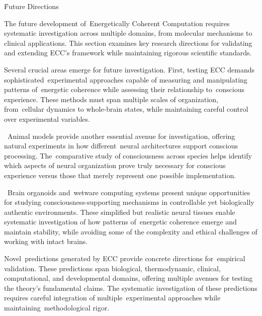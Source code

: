 \h{Future Directions}

\begin{refsection}

    The future development of~Energetically Coherent Computation requires systematic investigation across multiple domains, from molecular mechanisms to clinical applications. This section examines key research directions for validating and extending ECC's framework while maintaining rigorous scientific standards.

    Several crucial areas emerge for future investigation. First, testing ECC demands sophisticated~experimental approaches capable of measuring and manipulating patterns of~energetic coherence while assessing their relationship to~conscious experience. These methods must span multiple scales of organization, from~cellular dynamics to whole-brain states, while maintaining careful control over experimental variables.

    ~Animal models provide another essential avenue for investigation, offering natural experiments in how different~neural architectures support conscious processing. The~comparative study of consciousness across species helps identify which aspects of neural organization prove truly necessary for conscious experience versus those that merely represent one possible implementation.

    ~Brain organoids and~wetware computing systems present unique opportunities for studying consciousness-supporting mechanisms in controllable yet biologically authentic environments. These simplified but realistic neural tissues enable systematic investigation of how patterns of~energetic coherence emerge and maintain stability, while avoiding some of the complexity and ethical challenges of working with intact brains.

    Novel~predictions generated by ECC provide concrete directions for~empirical validation. These predictions span biological, thermodynamic, clinical, computational, and developmental domains, offering multiple avenues for testing the theory's fundamental claims. The systematic investigation of these predictions requires careful integration of multiple~experimental approaches while maintaining~methodological rigor.


\end{refsection}

